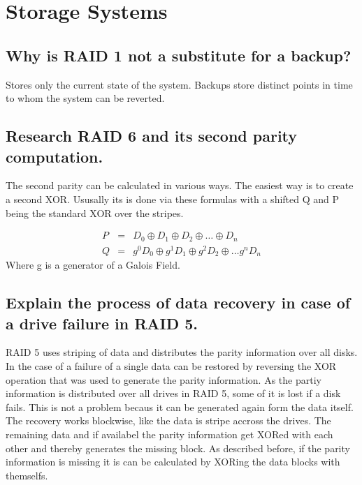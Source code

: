\section{Storage Systems}

\subsection*{Why is RAID 1 not a substitute for a backup?} %
\label{sub:why_is_raid_1_not_a_substitute_for_a_backup_}
	Stores only the current state of the system.
	Backups store distinct points in time to whom the system can be reverted.

\subsection{Research RAID 6 and its second parity computation.} %
\label{sub:research_raid_6_and_its_second_parity_computation_}
	The second parity can be calculated in various ways.
	The easiest way is to create a second XOR.
	Ususally its is done via these formulas with a shifted Q
	and P being the standard XOR over the stripes.

	\begin{eqnarray}
		P &=& D_0 \oplus D_1 \oplus D_2 \oplus \dotsc \oplus D_n \\
		Q &=& g^0D_0 \oplus g^1D_1 \oplus g^2D_2 \oplus \dotsc g^nD_n 
	\end{eqnarray}
	Where g is a generator of a Galois Field. 

\subsection{Explain the process of data recovery in case of a drive failure in RAID 5.} %
\label{sub:explain_the_process_of_data_recovery_in_case_of_a_drive_failure_in_raid_5_}
	RAID 5 uses striping of data and distributes the parity information over all disks.
	In the case of a failure of a single  data can be restored by reversing the XOR operation
	that was used to generate the parity information.
	As the partiy information is distributed over all drives in RAID 5,
	some of it is lost if a disk fails.
	This is not a problem becaus it can be generated again form the data itself.
	The recovery works blockwise,
	like the data is stripe accross the drives.
	The remaining data and if availabel the parity information get XORed with each other
	and thereby generates the missing block.
	As described before,
	if the parity information is missing it is can be calculated by XORing the data blocks 
	with themselfs.

